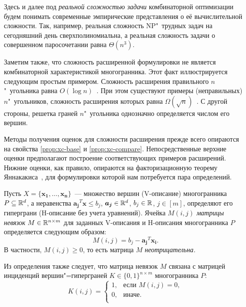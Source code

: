 \begin{remark}
\label{rem:RealComplexity}
Здесь и далее под \emph{реальной сложностью задачи} комбинаторной оптимизации будем понимать современные эмпирические представления о её вычислительной сложности. Так, например, реальная сложность NP"~трудных задач на сегодняшний день сверхполиномиальна, а реальная сложность задачи о совершенном паросочетании равна $\Theta(n^3)$.
\end{remark}


Заметим также, что сложность расширенной формулировки не является комбинаторной характеристикой многогранника. %
Этот факт иллюстрируется следующим простым примером.
Сложность расширения правильного $n$"~угольника равна $O(\log n)$~\cite{BenTal:2001}.
При этом существуют примеры (неправильных) $n$"~угольников, сложность расширения которых равна $\Omega(\sqrt{n})$~\cite{Fiorini:2012polygons}.
С другой стороны, решетка граней $n$"~угольника однозначно определяется числом его вершин.

Методы получения оценок для сложности расширения прежде всего опираются на свойства \ref{prop:xc-base} и \ref{prop:xc-compare}.
Непосредственные верхние оценки предполагают построение соответствующих примеров расширений.
Нижние оценки, как правило, опираются на факторизационную теорему Яннакакиса~\cite{Yannakakis:1991}, для формулировки которой нам потребуется пара определений. 

\begin{definition}\label{def:slack}
Пусть $X = \{\bm{x_1}, \dots, \bm{x_n}\}$~--- множество вершин (V-описание) многогранника $P \subseteq \mathbb{R}^d$, а неравенства $\bm{a_j}^T \bm{x} \le b_j$, $\bm{a_j}\in \mathbb{R}^d$, $b_j \in \mathbb{R}$, $j \in [m]$, определяют его гиперграни (H-описание без учета уравнений).
Ячейка $M(i,j)$ \emph{матрицы невязок} $M \in \mathbb{R}^{n\times m}$ для заданных V-описания и H-описания многогранника $P$ определяется следующим образом:
\[
M(i,j) = b_j - \bm{a_j}^T \bm{x_i}.
\]
В частности, $M(i,j) \ge 0$, то есть матрица $M$ \emph{неотрицательна.}
\end{definition}

Из определения также следует, что матрица невязок $M$ связана с матрицей инциденций вершин"=гиперграней $K \in \{0,1\}^{n\times m}$ многогранника $P$:
\[
K(i,j) = \begin{cases}
1, & \text{если $M(i,j) = 0$},\\
0, & \text{иначе}.\\
\end{cases}
\]

